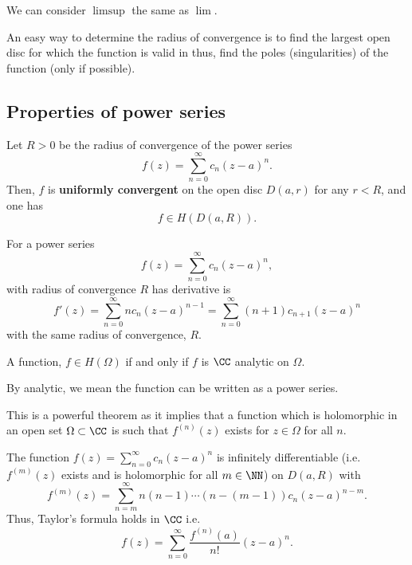 \documentclass[12pt, a4paper]{article}
\begin{document}
\begin{mdremark}
    We can consider \(\limsup\) the same as \(\lim\).
\end{mdremark}

\begin{mdnote}
    An easy way to determine the radius of convergence is to find the largest open disc for which the function is valid in thus, find the poles (singularities) of the function (only if possible).
\end{mdnote}

\subsection{Properties of power series}

\begin{mdthm}
    Let \(R>0\) be the radius of convergence of the power series 
    \[f(z) = \sum_{n=0}^{\infty} c_n (z-a)^n.\]
    Then, \(f\) is \textbf{uniformly convergent} on the open disc \(D(a,r)\) for any \(r<R\), and one has 
    \[f \in H(D(a,R)).\]
\end{mdthm}

\begin{corollary}
    For a power series 
    \[f(z) = \sum_{n=0}^{\infty} c_n (z-a)^n,\]
    with radius of convergence \(R\) has derivative is 
    \[f'(z) = \sum_{n=0}^{\infty} nc_n (z-a)^{n-1} = \sum_{n=0}^{\infty} (n+1) c_{n+1} (z-a)^n\]
    with the same radius of convergence, \(R\).
\end{corollary}

\begin{mdthm}
    A function, \(f \in H(\Omega)\) if and only if \(f\) is \(\CC\) analytic on \(\Omega\).
\end{mdthm}

\begin{mdremark}
    By analytic, we mean the function can be written as a power series.
\end{mdremark}

\begin{mdnote}
    This is a powerful theorem as it implies that a function which is holomorphic in an open set \(\Omega \subset \CC\) is such that \(f^{(n)}(z)\) exists for \(z \in \Omega\) for all \(n\).
\end{mdnote}

\begin{mdcor}
    The function \(f(z) = \sum_{n=0}^{\infty} c_n (z-a)^n\) is infinitely differentiable (i.e. \(f^{(m)}(z)\) exists and is holomorphic for all \(m \in \NN\)) on \(D(a,R)\) with 
    \[f^{(m)}(z) = \sum_{n=m}^{\infty} n(n-1) \cdots (n-(m-1)) c_n (z-a)^{n-m}.\]
    Thus, Taylor's formula holds in \(\CC\) i.e. 
    \[f(z) = \sum_{n=0}^{\infty} \frac{f^{(n)}(a)}{n!}(z-a)^n.\]
\end{mdcor}
\end{document}
